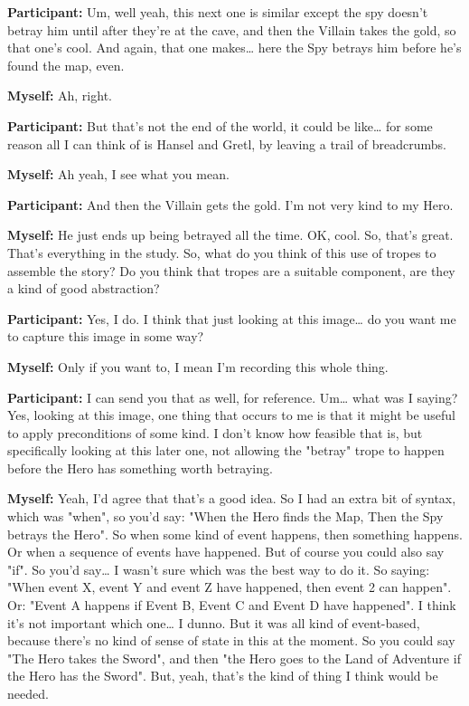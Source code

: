 \documentclass[11pt]{report}
\newcommand{\llabel}[1]{\hypertarget{llineno:#1}{\linelabel{#1}}}
\begin{document}
\begin{linenumbers}
\textbf{Participant:} Um, well yeah, this next one is similar except the spy doesn't betray him until after they're at the cave, and then the Villain takes the gold, so that one's cool. And again, that one makes\ldots{} here the Spy betrays him before he's found the map, even.

\textbf{Myself:} Ah, right.

\textbf{Participant:} But that's not the end of the world, it could be like\ldots{} for some reason all I can think of is Hansel and Gretl, by leaving a trail of breadcrumbs.

\textbf{Myself:} Ah yeah, I see what you mean.

\textbf{Participant:} And then the Villain gets the gold. I'm not very kind to my Hero.

\textbf{Myself:} He just ends up being betrayed all the time. OK, cool. So, that's great. That's everything in the study. So, what do you think of this use of tropes to assemble the story? Do you think that tropes are a suitable component, are they a kind of good abstraction?

\textbf{Participant:} Yes, I do. I think that just looking at this image\ldots{} do you want me to capture this image in some way?

\textbf{Myself:} Only if you want to, I mean I'm recording this whole thing.

\textbf{Participant:} I can send you that as well, for reference. Um\ldots{} what was I saying? Yes, looking at this image, one thing that occurs to me is that it might be useful to apply preconditions of some kind. I don't know how feasible that is, but specifically looking at this later one, not allowing the "betray" trope to happen before the Hero has something worth betraying.\llabel{lne:feature8h}

\textbf{Myself:} Yeah, I'd agree that that's a good idea. So I had an extra bit of syntax, which was "when", so you'd say: "When the Hero finds the Map, Then the Spy betrays the Hero". So when some kind of event happens, then something happens. Or when a sequence of events have happened. But of course you could also say "if". So you'd say\ldots{} I wasn't sure which was the best way to do it. So saying: "When event X, event Y and event Z have happened, then event 2 can happen". Or: "Event A happens if Event B, Event C and Event D have happened". I think it's not important which one\ldots{} I dunno. But it was all kind of event-based, because there's no kind of sense of state in this at the moment. So you could say "The Hero takes the Sword", and then "the Hero goes to the Land of Adventure if the Hero has the Sword". But, yeah, that's the kind of thing I think would be needed.


\end{linenumbers}
\end{document}
